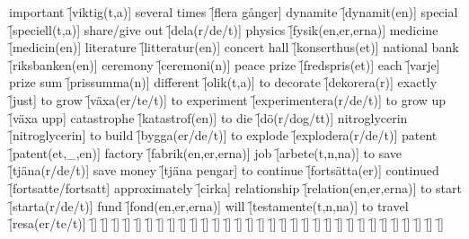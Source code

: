 \begin{questions}
\begin{multicols}{2}
        \question important \f[viktig(t,a)]
        \question several times \f[flera gånger]
        \question dynamite \f[dynamit(en)]
        \question special \f[speciell(t,a)]
        \question share/give out \f[dela(r/de/t)]
        \question physics \f[fysik(en,er,erna)]
        \question medicine \f[medicin(en)]
        \question literature \f[litteratur(en)]
        \question concert hall \f[konserthus(et)]
        \question national bank \f[riksbanken(en)]
        \question ceremony \f[ceremoni(n)]
        \question peace prize \f[fredspris(et)]
        \question each \f[varje]
        \question prize sum \f[prissumma(n)]
        \question different \f[olik(t,a)]
        \question to decorate \f[dekorera(r)]
        \question exactly \f[just]
        \question to grow \f[växa(er/te/t)]
        \question to experiment \f[experimentera(r/de/t)]
        \question to grow up \f[växa upp]
        \question catastrophe \f[katastrof(en)]
        \question to die \f[dö(r/dog/tt)]
        \question nitroglycerin \f[nitroglycerin]
        \question to build \f[bygga(er/de/t)]
        \question to explode \f[explodera(r/de/t)]
        \question patent \f[patent(et,\_,en)]
        \question factory \f[fabrik(en,er,erna)]
        \question job \f[arbete(t,n,na)]
        \question to save \f[tjäna(r/de/t)]
        \question save money \f[tjäna pengar]
        \question to continue \f[fortsätta(er)]
        \question continued \f[fortsatte/fortsatt]
        \question approximately \f[cirka]
        \question relationship \f[relation(en,er,erna)]
        \question to start \f[starta(r/de/t)]
        \question fund \f[fond(en,er,erna)]
        \question will \f[testamente(t,n,na)]
        \question to travel \f[resa(er/te/t)]
        \question  \f[]
        \question  \f[]
        \question  \f[]
        \question  \f[]
        \question  \f[]
        \question  \f[]
        \question  \f[]
        \question  \f[]
        \question  \f[]
        \question  \f[]
        \question  \f[]
        \question  \f[]
        \question  \f[]
        \question  \f[]
        \question  \f[]
        \question  \f[]
        \question  \f[]
        \question  \f[]
        \question  \f[]
        \question  \f[]
        \question  \f[]
        \question  \f[]
        \question  \f[]
        \question  \f[]
        \question  \f[]
        \question  \f[]
        \question  \f[]
        \question  \f[]
        \question  \f[]
        \question  \f[]
        \question  \f[]
        \question  \f[]
    \end{multicols}
\end{questions}
